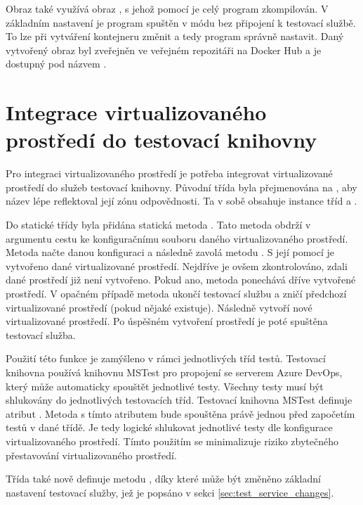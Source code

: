 Obraz také využívá obraz , s jehož pomocí je celý program zkompilován. V základním nastavení je program spuštěn v módu bez připojení k testovací službě. To lze při vytváření kontejneru změnit a tedy program správně nastavit. Daný vytvořený obraz byl zveřejněn ve veřejném repozitáři na Docker Hub\cite{docker_hub} a je dostupný pod názvem .

\section{Integrace virtualizovaného prostředí do testovací knihovny}

Pro integraci virtualizovaného prostředí je potřeba integrovat virtualizované prostředí do služeb testovací knihovny. Původní třída  byla přejmenována na , aby název lépe reflektoval její zónu odpovědnosti. Ta v sobě obsahuje instance tříd  a .

Do statické třídy  byla přidána statická metoda . Tato metoda obdrží v argumentu cestu ke konfiguračnímu souboru daného virtualizovaného prostředí. Metoda načte danou konfiguraci a následně zavolá metodu . S její pomocí je vytvořeno dané virtualizované prostředí. Nejdříve je ovšem zkontrolováno, zdali dané prostředí již není vytvořeno. Pokud ano, metoda ponechává dříve vytvořené prostředí. V opačném případě metoda ukončí testovací službu a zničí předchozí virtualizované prostředí (pokud nějaké existuje). Následně vytvoří nové virtualizované prostředí. Po úspěšném vytvoření prostředí je poté spuštěna testovací služba.

Použití této funkce je zamýšleno v rámci jednotlivých tříd testů. Testovací knihovna používá knihovnu MSTest pro propojení se serverem Azure DevOps, který může automaticky spouštět jednotlivé testy. Všechny testy musí být shlukovány do jednotlivých testovacích tříd. Testovací knihovna MSTest definuje atribut . Metoda s tímto atributem bude spouštěna právě jednou před započetím testů v dané třídě. Je tedy logické shlukovat jednotlivé testy dle konfigurace virtualizovaného prostředí. Tímto použitím se minimalizuje riziko zbytečného přestavování virtualizovaného prostředí. 

Třída  také nově definuje metodu , díky které může být změněno základní nastavení testovací služby, jež je popsáno v sekci \ref{sec:test_service_changes}.


